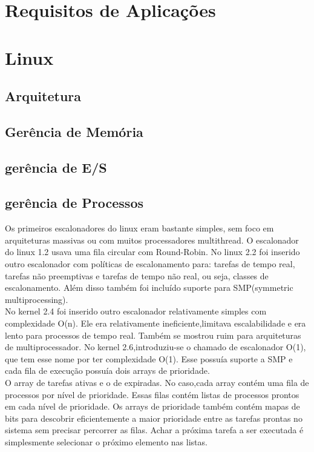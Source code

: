 \documentclass[conference]{IEEEtran}
\begin{document}
\section{Requisitos de Aplicações}\label{sec:req}

\section{Linux}\label{sec:linux}

\subsection{Arquitetura}\label{sec:LinuxArq}

\subsection{Gerência de Memória}\label{sec:LinuxMem}

\subsection{gerência de E/S}\label{sec:LinuxES}

\subsection{gerência de Processos}\label{sec:LinuxPROC}

Os primeiros escalonadores do linux eram bastante simples, sem foco em arquiteturas massivas ou com muitos processadores multithread. O escalonador do linux 1.2 usava uma fila circular com Round-Robin. No linux 2.2 foi inserido outro escalonador com políticas de escalonamento para: tarefas de tempo real, tarefas não preemptivas e tarefas de tempo não real, ou seja, classes de escalonamento. Além disso também foi incluído suporte para SMP(symmetric multiprocessing)\cite{LinuxSchedulerIBM}.\\

 No kernel 2.4 foi  inserido outro escalonador relativamente simples com complexidade O(n). Ele era relativamente ineficiente,limitava escalabilidade e era lento para processos de tempo real. Também se mostrou ruim para arquiteturas de multiprocessador. No kernel 2.6,introduziu-se o chamado de escalonador O(1), que tem esse nome por ter complexidade O(1). Esse possuía suporte a SMP e cada fila de execução possuía dois arrays de prioridade.\\

 O array de tarefas ativas e o de expiradas. No caso,cada array contém uma fila de processos por nível de prioridade. Essas filas contém listas de processos prontos em cada nível de prioridade. Os  arrays de prioridade também contém mapas de bits para descobrir eficientemente a maior prioridade entre as tarefas prontas no sistema sem precisar percorrer as filas. Achar a próxima tarefa a ser executada é simplesmente selecionar o próximo elemento nas listas.\\
\end{document}

